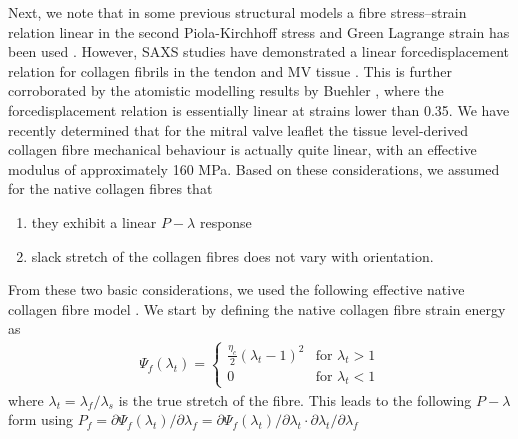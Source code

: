     
    Next, we note that in some previous structural models a fibre stress–strain relation linear in the second Piola-Kirchhoff stress and Green Lagrange strain has been used \cite{sacks_incorporation_2003}\cite{fan_simulation_2014}\cite{lanir_structural_1979}. However, SAXS studies have demonstrated a linear force\Hyphdash displacement relation for collagen fibrils in the tendon \cite{sasaki_elongation_1996}\cite{sasaki_stress_1996} and MV tissue \cite{liao_relation_2007}. This is further corroborated by the atomistic modelling results by Buehler \cite{buehler_atomistic_2006}, where the force\Hyphdash displacement relation is essentially linear at strains lower than 0.35. We have recently determined that for the mitral valve leaflet the tissue level-derived collagen fibre mechanical behaviour is actually quite linear, with an effective modulus of approximately 160 MPa. Based on these considerations, we assumed for the native collagen fibres that
        \begin{enumerate}
            \item they exhibit a linear $P-\lambda$ response
            \item slack stretch of the collagen fibres does not vary with orientation.
        \end{enumerate}
    From these two basic considerations, we used the following effective native collagen fibre model \cite{fata_insights_2014}\cite{fan_simulation_2014}. We start by defining the native collagen fibre strain energy as
        \begin{equation}\label{c3:eqn:21}
        \begin{aligned}
        \Psi_f(\lambda_t) = 
            \begin{cases} 
                \frac{\eta_c}{2} \left(\lambda_t -1\right)^2 & \text{for } \lambda_t >1\\
                0 & \text{for } \lambda_t < 1  
            \end{cases}
        \end{aligned}
        \end{equation}
    where $\lambda_t = \lambda_f/\lambda_s$ is the true stretch of the fibre. This leads to the following $P-\lambda$ form using $P_f = \partial \Psi_f(\lambda_t)/\partial \lambda_f = \partial \Psi_f(\lambda_t)/\partial \lambda_t \cdot \partial \lambda_t/\partial \lambda_f$
